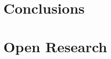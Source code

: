 \documentclass[draft]{agujournal2019}
\begin{document}
\section{Conclusions}
\label{sec:conclusions}

%
%



\section{Open Research}



%


\end{document}
